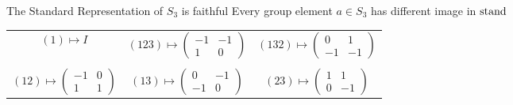 \begin{frame}{The Standard Representation of $S_3$ is faithful}
    \large
    Every group element $a \in S_3$ has different image in $\operatorname{stand}$

    \pause
    \vspace{1em}
    \centering
    \begin{tabular}{c c c}
        $(1) \mapsto I$ & $(123) \mapsto \begin{pmatrix}
            -1 & -1 \\
            1 & 0
        \end{pmatrix}$ & $(132) \mapsto \begin{pmatrix}
            0 & 1 \\
            -1 & -1
        \end{pmatrix}$ \\\\ $(12) \mapsto \begin{pmatrix}
            -1 & 0 \\
            1 & 1
        \end{pmatrix}$ & $(13) \mapsto \begin{pmatrix}
            0 & -1 \\
            -1 & 0
        \end{pmatrix}$ & $(23) \mapsto \begin{pmatrix}
            1 & 1 \\
            0 & -1
        \end{pmatrix}$
    \end{tabular}
\end{frame}

